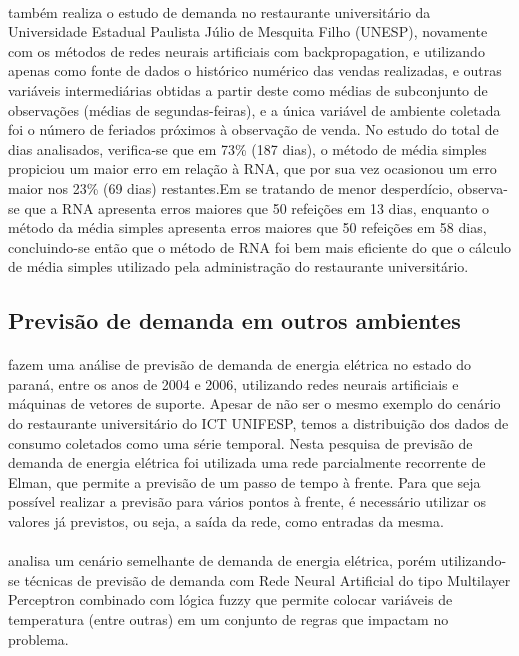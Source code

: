 \documentclass[	12pt, Times, openright, twoside, a4paper, english, brazil]{abntex2}
\begin{document}
        \paragraph*{} \cite{Rocha2011} também realiza o estudo de demanda no restaurante universitário da Universidade Estadual Paulista Júlio de Mesquita Filho (UNESP), novamente com os métodos de redes neurais artificiais com backpropagation, e utilizando apenas como fonte de dados o histórico numérico das vendas realizadas, e outras variáveis intermediárias obtidas a partir deste como médias de subconjunto de observações (médias de segundas-feiras), e a única variável de ambiente coletada foi o número de feriados próximos à observação de venda. No estudo do total de dias analisados, verifica-se que em 73\% (187 dias), o método de média simples propiciou um maior erro em relação à RNA, que por sua vez ocasionou um erro maior nos 23\% (69 dias) restantes.Em se tratando de menor desperdício, observa-se que a RNA apresenta erros maiores que 50 refeições em 13 dias, enquanto o método da média simples apresenta erros maiores que 50 refeições em 58 dias, concluindo-se então que o método de RNA foi bem mais eficiente do que o cálculo de média simples utilizado pela administração do restaurante universitário.
      
      \subsection{Previsão de demanda em outros ambientes} 
        \paragraph*{} \cite{RUAS2012} fazem uma análise de previsão de demanda de energia elétrica no estado do paraná, entre os anos de 2004 e 2006, utilizando redes neurais artificiais e máquinas de vetores de suporte. Apesar de não ser o mesmo exemplo do cenário do restaurante universitário do ICT UNIFESP, temos a distribuição dos dados de consumo coletados como uma série temporal. Nesta pesquisa de previsão de demanda de energia elétrica foi utilizada uma rede parcialmente recorrente de Elman, que permite a previsão de um passo de tempo à frente. Para que seja possível realizar a previsão para vários pontos à frente, é necessário utilizar os valores já previstos, ou seja, a saída da rede, como entradas da mesma.
        
        \paragraph*{} \cite{Almeida2013} analisa um cenário semelhante de demanda de energia elétrica, porém utilizando-se técnicas de previsão de demanda com Rede Neural Artificial do tipo Multilayer Perceptron combinado com lógica fuzzy que permite colocar variáveis de temperatura (entre outras) em um conjunto de regras que impactam no problema.
        
\end{document}
